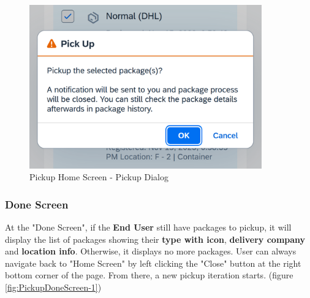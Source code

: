 \begin{figure}[H]
	\centering
	\includegraphics[height=200pt]{images/user_doc/pickup/PickupDialog.png}
	\caption{Pickup Home Screen - Pickup Dialog}
	\label{fig:PickupDialog}
\end{figure}


\subsubsection{Done Screen}

At the "Done Screen", if the \textbf{End User} still have packages to pickup, it will display the list of packages showing their \textbf{type with icon}, \textbf{delivery company} and \textbf{location info}. Otherwise, it displays no more packages. 
User can always navigate back to "Home Screen" by left clicking the "Close" button at the right bottom corner of the page.
From there, a new pickup iteration starts.
(figure \ref{fig:PickupDoneScreen-1})

